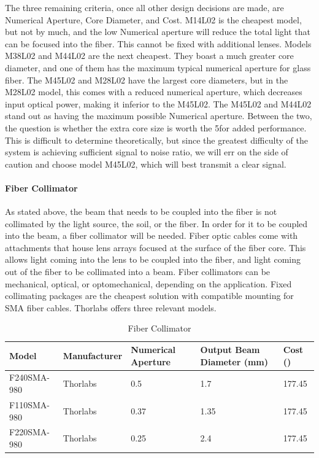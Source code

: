 The three remaining criteria, once all other design decisions are made, are Numerical Aperture, Core Diameter, and Cost. M14L02 is the cheapest model, but not by much, and the low Numerical aperture will reduce the total light that can be focused into the fiber. This cannot be fixed with additional lenses. Models M38L02 and M44L02 are the next cheapest. They boast a much greater core diameter, and one of them has the maximum typical numerical aperture for glass fiber. The M45L02 and M28L02 have the largest core diameters, but in the M28L02 model, this comes with a reduced numerical aperture, which decreases input optical power, making it inferior to the M45L02. The M45L02 and M44L02 stand out as having the maximum possible Numerical aperture. Between the two, the question is whether the extra core size is worth the 5\textdollar for added performance. This is difficult to determine theoretically, but since the greatest difficulty of the system is achieving sufficient signal to noise ratio, we will err on the side of caution and choose model M45L02, which will best transmit a clear signal.

\paragraph{Fiber Collimator}

As stated above, the beam that needs to be coupled into the fiber is not collimated by the light source, the soil, or the fiber. In order for it to be coupled into the beam, a fiber collimator will be needed. Fiber optic cables come with attachments that house lens arrays focused at the surface of the fiber core. This allows light coming into the lens to be coupled into the fiber, and light coming out of the fiber to be collimated into a beam. Fiber collimators can be mechanical, optical, or optomechanical, depending on the application. Fixed collimating packages are the cheapest solution with compatible mounting for SMA fiber cables. Thorlabs offers three relevant models.

\begin{table}[H]
	\centering
	\label{table:Fiber Collimator}
	\caption{Fiber Collimator}
	\bigskip
	\begin{tabular}{|p{2cm}|p{2.5cm}|p{2cm}|p{2.75cm}|p{1.75cm}|}
	\hline
	Model & Manufacturer & Numerical Aperture & Output Beam Diameter (mm) & Cost (\textdollar)\\
	\hline
	F240SMA-980 & Thorlabs & 0.5 & 1.7 & 177.45\\
	\hline
	F110SMA-980 & Thorlabs & 0.37 & 1.35 & 177.45\\
	\hline
	F220SMA-980 & Thorlabs & 0.25 & 2.4 & 177.45\\
	\hline
	\end{tabular}
\end{table}


